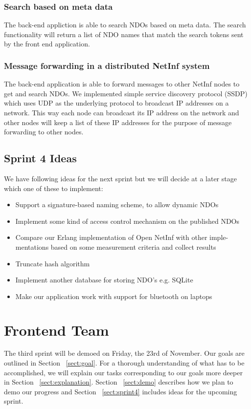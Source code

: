 \documentclass[a4paper,10pt]{article}
\newcommand{\sect}[1]{Section ~\ref{sect:#1}}
\begin{document}
\subsubsection {Search based on meta data}
The back-end appliction is able to search NDOs based on meta data. The search
functionality will return a list of NDO names that match the search tokens sent
by the front end application.
\subsubsection {Message forwarding in a distributed NetInf system}
The back-end application is able to forward messages to other NetInf nodes
to get and search NDOs. We implemented simple service discovery protocol
(SSDP) which uses UDP as the underlying protocol to broadcast IP addresses
on a network. This way each node can broadcast its IP address on the network
and other nodes will keep a list of these IP addresses for the purpose of message
forwarding to other nodes.

\subsection {Sprint 4 Ideas}
We have following ideas for the next sprint but we will decide at a later stage
which one of these to implement:
\begin{itemize}
\item Support a signature-based naming scheme, to allow dynamic NDOs
\item Implement some kind of access control mechanism on the published NDOs
\item Compare our Erlang implementation of Open NetInf with other imple-
mentations based on some measurement criteria and collect results
\item Truncate hash algorithm
\item Implement another database for storing NDO’s e.g. SQLite
\item Make our application work with support for bluetooth on laptops
\end{itemize}
\section{Frontend Team}

The third sprint will be demoed on Friday, the 23rd of November.
Our goals are outlined in \sect{goal}. For a thorough understanding of
what has to be accomplished, we will explain our tasks corresponding to our
goals more deeper in \sect{explanation}. \sect{demo} describes how
we plan to demo our progress and \sect{sprint4} includes ideas for the upcoming sprint.
\end{document}
